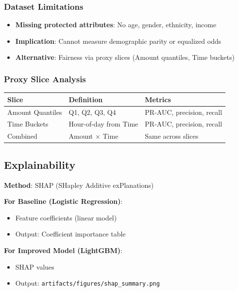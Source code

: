 \documentclass[12pt,a4paper]{article}
\newcommand{\code}[1]{\texttt{#1}}
\begin{document}
\subsubsection{Dataset Limitations}
\begin{itemize}
    \item \textbf{Missing protected attributes}: No age, gender, ethnicity, income
    \item \textbf{Implication}: Cannot measure demographic parity or equalized odds
    \item \textbf{Alternative}: Fairness via proxy slices (Amount quantiles, Time buckets)
\end{itemize}

\subsubsection{Proxy Slice Analysis}

\begin{table}[H]
\centering
\small
\begin{tabular}{|l|p{2.5cm}|p{2.5cm}|}
\hline
\textbf{Slice} & \textbf{Definition} & \textbf{Metrics} \\
\hline
Amount Quantiles & Q1, Q2, Q3, Q4 & PR-AUC, precision, recall \\
Time Buckets & Hour-of-day from Time & PR-AUC, precision, recall \\
Combined & Amount × Time & Same across slices \\
\hline
\end{tabular}
\end{table}

\subsection{Explainability}

\textbf{Method}: SHAP (SHapley Additive exPlanations)

\textbf{For Baseline (Logistic Regression)}:
\begin{itemize}
    \item Feature coefficients (linear model)
    \item Output: Coefficient importance table
\end{itemize}

\textbf{For Improved Model (LightGBM)}:
\begin{itemize}
    \item SHAP values
    \item Output: \code{artifacts/figures/shap\_summary.png}
\end{itemize}
\end{document}
